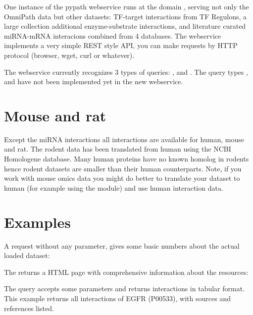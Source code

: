 \documentclass[letterpaper,10pt,english]{sphinxmanual}
\begin{document}
One instance of the pypath webservice runs at the domain
, serving not only the OmniPath data but other datasets:
TF-target interactions from TF Regulons, a large collection additional
enzyme-substrate interactions, and literature curated miRNA-mRNA interacions
combined from 4 databases. The webservice implements a very simple REST style
API, you can make requests by HTTP protocol (browser, wget, curl or whatever).

The webservice currently recognizes 3 types of queries: ,
 and . The query types ,  and
 have not been implemented yet in the new webservice.


\section{Mouse and rat}
\label{\detokenize{webservice:mouse-and-rat}}
Except the miRNA interactions all interactions are available for human, mouse
and rat. The rodent data has been translated from human using the NCBI
Homologene database. Many human proteins have no known homolog in rodents
hence rodent datasets are smaller than their human counterparts. Note, if you
work with mouse omics data you might do better to translate your dataset to
human (for example using the  module) and use human
interaction data.


\section{Examples}
\label{\detokenize{webservice:examples}}
A request without any parameter, gives some basic numbers about the actual
loaded dataset:
\begin{quote}

\end{quote}

The  returns a HTML page with comprehensive information about the
resources:
\begin{quote}

\end{quote}

The  query accepts some parameters and returns interactions in
tabular format. This example returns all interactions of EGFR (P00533), with
sources and references listed.
\begin{quote}

\end{quote}
\end{document}
